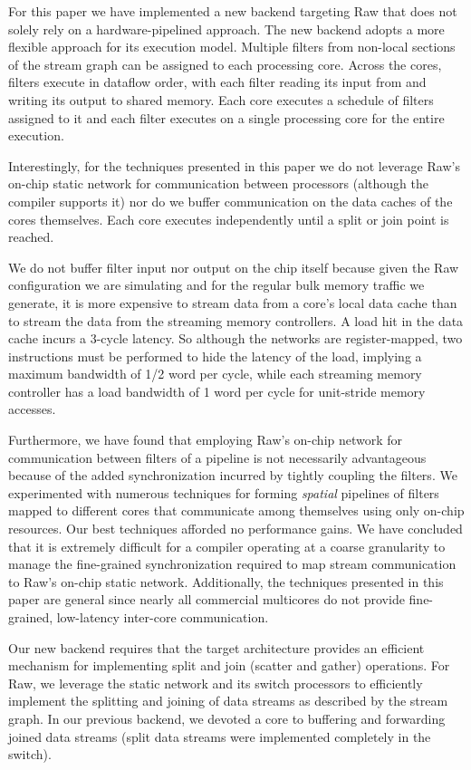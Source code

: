 For this paper we have implemented a new backend targeting Raw that
does not solely rely on a hardware-pipelined approach.  The new
backend adopts a more flexible approach for its execution model.
Multiple filters from non-local sections of the stream graph can be
assigned to each processing core.  Across the cores, filters execute
in dataflow order, with each filter reading its input from and writing
its output to shared memory. Each core executes a schedule of filters
assigned to it and each filter executes on a single processing core
for the entire execution.

Interestingly, for the techniques presented in this paper we do not
leverage Raw's on-chip static network for communication between
processors (although the compiler supports it) nor do we buffer
communication on the data caches of the cores themselves. Each core
executes independently until a split or join point is reached.

We do not buffer filter input nor output on the chip itself because
given the Raw configuration we are simulating and for the regular bulk
memory traffic we generate, it is more expensive to stream data from a
core's local data cache than to stream the data from the streaming
memory controllers. A load hit in the data cache incurs a 3-cycle
latency.  So although the networks are register-mapped, two
instructions must be performed to hide the latency of the load,
implying a maximum bandwidth of 1/2 word per cycle, while each
streaming memory controller has a load bandwidth of 1 word per cycle
for unit-stride memory accesses.

Furthermore, we have found that employing Raw's on-chip network for
communication between filters of a pipeline is not necessarily
advantageous because of the added synchronization incurred by tightly
coupling the filters.  We experimented with numerous techniques for
forming {\it spatial} pipelines of filters mapped to different cores
that communicate among themselves using only on-chip resources.  Our
best techniques afforded no performance gains.  We have concluded that
it is extremely difficult for a compiler operating at a coarse
granularity to manage the fine-grained synchronization required to map
stream communication to Raw's on-chip static network.  Additionally,
the techniques presented in this paper are general since nearly all
commercial multicores do not provide fine-grained, low-latency
inter-core communication.

Our new backend requires that the target architecture provides an
efficient mechanism for implementing split and join (scatter and
gather) operations.  For Raw, we leverage the static network and its
switch processors to efficiently implement the splitting and joining
of data streams as described by the stream graph.  In our previous
backend, we devoted a core to buffering and forwarding joined data
streams (split data streams were implemented completely in the
switch).

